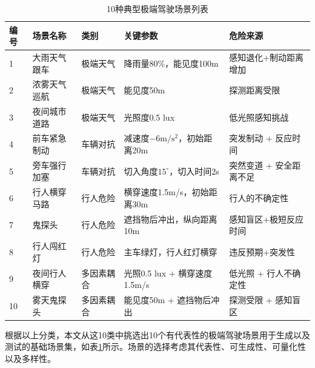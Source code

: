 \begin{table}[H]
  \centering
  \caption{10种典型极端驾驶场景列表}
  \label{tab:scene_list}
  \small
  \begin{tabular}{p{1cm}p{2.5cm}p{1.8cm}p{4.5cm}p{3cm}}
    \toprule
    编号 & 场景名称 & 类别 & 关键参数 & 危险来源 \\
    \midrule
    1 & 大雨天气跟车 & 极端天气 & 降雨量80\%，能见度100m & 感知退化+制动距离增加 \\
    2 & 浓雾天气巡航 & 极端天气 & 能见度50m & 探测距离受限 \\
    3 & 夜间城市道路 & 极端天气 & 光照度0.5 lux & 低光照感知挑战 \\
    4 & 前车紧急制动 & 车辆对抗 & \parbox[t]{4.5cm}{\raggedright 减速度$-6\mathrm{m/s^2}$，初始距离20m} & 突发制动 + 反应时间 \\
    5 & 旁车强行加塞 & 车辆对抗 & \parbox[t]{4.5cm}{\raggedright 切入角度$15^\circ$，切入时间2s} & 突然变道 + 安全距离不足 \\
    6 & 行人横穿马路 & 行人危险 & \parbox[t]{4.5cm}{\raggedright 横穿速度1.5m/s，初始距离30m} & 行人的不确定性 \\
    7 & 鬼探头 & 行人危险 & \parbox[t]{4.5cm}{\raggedright 遮挡物后冲出，纵向距离10m} & 感知盲区+极短反应时间 \\
    8 & 行人闯红灯 & 行人危险 & \parbox[t]{4.5cm}{\raggedright 主车绿灯，行人红灯横穿} & 违反预期+突发性 \\
    9 & 夜间行人横穿 & 多因素耦合 & \parbox[t]{4.5cm}{\raggedright 光照0.5 lux + 横穿速度1.5m/s} & 低光照 + 行人不确定性 \\
    10 & 雾天鬼探头 & 多因素耦合 & \parbox[t]{4.5cm}{\raggedright 能见度50m + 遮挡物后冲出} & 探测受限 + 感知盲区 \\
    \bottomrule
  \end{tabular}
\end{table}
根据以上分类，本文从这10类中挑选出10个有代表性的极端驾驶场景用于生成以及测试的基础场景集，如表\ref{tab:scene_list}所示。场景的选择考虑其代表性、可生成性、可量化性以及多样性\cite{zeng2021autonomous}。
